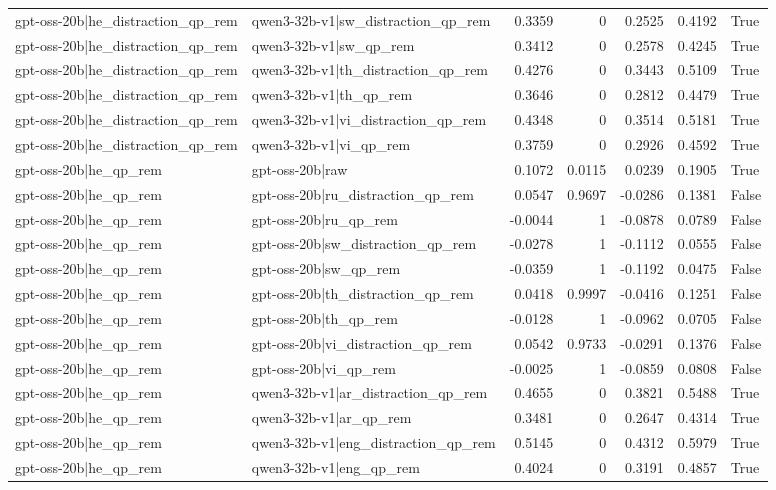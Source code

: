 \begin{table}
\begin{tabular}{l l r r r r l}
gpt-oss-20b|he_distraction_qp_rem & qwen3-32b-v1|sw_distraction_qp_rem & 0.3359 & 0 & 0.2525 & 0.4192 & True \\
gpt-oss-20b|he_distraction_qp_rem & qwen3-32b-v1|sw_qp_rem & 0.3412 & 0 & 0.2578 & 0.4245 & True \\
gpt-oss-20b|he_distraction_qp_rem & qwen3-32b-v1|th_distraction_qp_rem & 0.4276 & 0 & 0.3443 & 0.5109 & True \\
gpt-oss-20b|he_distraction_qp_rem & qwen3-32b-v1|th_qp_rem & 0.3646 & 0 & 0.2812 & 0.4479 & True \\
gpt-oss-20b|he_distraction_qp_rem & qwen3-32b-v1|vi_distraction_qp_rem & 0.4348 & 0 & 0.3514 & 0.5181 & True \\
gpt-oss-20b|he_distraction_qp_rem & qwen3-32b-v1|vi_qp_rem & 0.3759 & 0 & 0.2926 & 0.4592 & True \\
gpt-oss-20b|he_qp_rem & gpt-oss-20b|raw & 0.1072 & 0.0115 & 0.0239 & 0.1905 & True \\
gpt-oss-20b|he_qp_rem & gpt-oss-20b|ru_distraction_qp_rem & 0.0547 & 0.9697 & -0.0286 & 0.1381 & False \\
gpt-oss-20b|he_qp_rem & gpt-oss-20b|ru_qp_rem & -0.0044 & 1 & -0.0878 & 0.0789 & False \\
gpt-oss-20b|he_qp_rem & gpt-oss-20b|sw_distraction_qp_rem & -0.0278 & 1 & -0.1112 & 0.0555 & False \\
gpt-oss-20b|he_qp_rem & gpt-oss-20b|sw_qp_rem & -0.0359 & 1 & -0.1192 & 0.0475 & False \\
gpt-oss-20b|he_qp_rem & gpt-oss-20b|th_distraction_qp_rem & 0.0418 & 0.9997 & -0.0416 & 0.1251 & False \\
gpt-oss-20b|he_qp_rem & gpt-oss-20b|th_qp_rem & -0.0128 & 1 & -0.0962 & 0.0705 & False \\
gpt-oss-20b|he_qp_rem & gpt-oss-20b|vi_distraction_qp_rem & 0.0542 & 0.9733 & -0.0291 & 0.1376 & False \\
gpt-oss-20b|he_qp_rem & gpt-oss-20b|vi_qp_rem & -0.0025 & 1 & -0.0859 & 0.0808 & False \\
gpt-oss-20b|he_qp_rem & qwen3-32b-v1|ar_distraction_qp_rem & 0.4655 & 0 & 0.3821 & 0.5488 & True \\
gpt-oss-20b|he_qp_rem & qwen3-32b-v1|ar_qp_rem & 0.3481 & 0 & 0.2647 & 0.4314 & True \\
gpt-oss-20b|he_qp_rem & qwen3-32b-v1|eng_distraction_qp_rem & 0.5145 & 0 & 0.4312 & 0.5979 & True \\
gpt-oss-20b|he_qp_rem & qwen3-32b-v1|eng_qp_rem & 0.4024 & 0 & 0.3191 & 0.4857 & True \\

\end{tabular}
\end{table}
